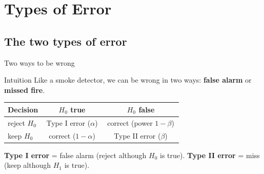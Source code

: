 \documentclass[aspectratio=169,11pt]{beamer}
\begin{document}
\section[Errors]{Types of Error}

\subsection{The two types of error}

\begin{frame}{Two ways to be wrong}
  \begin{block}{Intuition}
    Like a smoke detector, we can be wrong in two ways:
    \textbf{false alarm} or \textbf{missed fire}.
  \end{block}
  \begin{center}
    \renewcommand{\arraystretch}{1.5}
    \begin{tabular}{lcc}
      \toprule
       \textbf{Decision} & \textbf{$H_0$ true} & \textbf{$H_0$ false}\\
      \midrule
      reject $H_0$
        & \cellcolor{hsbirot!20}\,Type I error ($\alpha$)\,
        & \cellcolor{green!18}\,correct (power $1-\beta$)\,\\
      keep $H_0$
        & \cellcolor{green!18}\,correct ($1-\alpha$)\,
        & \cellcolor{hsbiorange!28}\,Type II error ($\beta$)\,\\
      \bottomrule
    \end{tabular}
  \end{center}
  \footnotesize \textbf{Type I error} = false alarm (reject although $H_0$ is
  true). \quad \textbf{Type II error} = miss (keep although $H_1$ is true).
\end{frame}
\end{document}
